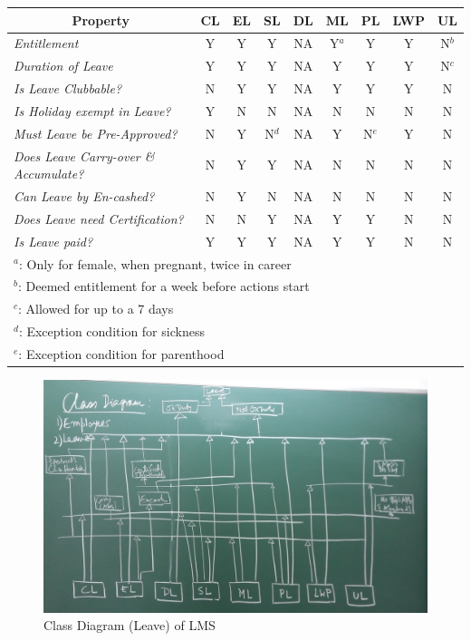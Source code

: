 \documentclass{article}
\begin{document}
\begin{center}

\begin{tabular}{|l|c|c|c|c|c|c|c|c|}\hline
\multicolumn{1}{|c|}{\bf Property} & 
\multicolumn{1}{c|}{\bf CL} &
\multicolumn{1}{c|}{\bf EL} &
\multicolumn{1}{c|}{\bf SL} &
\multicolumn{1}{c|}{\bf DL} &
\multicolumn{1}{c|}{\bf ML} &
\multicolumn{1}{c|}{\bf PL} &
\multicolumn{1}{c|}{\bf LWP} &
\multicolumn{1}{c|}{\bf UL} \\ \hline
{\em Entitlement} & Y & Y & Y & NA & Y$^a$ & Y & Y & N$^b$ \\ \hline
{\em Duration of Leave} & Y & Y & Y & NA & Y & Y & Y & N$^c$ \\ \hline
{\em Is Leave Clubbable?} & N & Y & Y & NA & Y & Y & Y & N \\ \hline
{\em Is Holiday exempt in Leave?} & Y & N & N & NA & N & N & N & N \\ \hline
{\em Must Leave be Pre-Approved?} & N & Y & N$^d$ & NA & Y & N$^e$ & Y & N \\ \hline
{\em Does Leave Carry-over \& Accumulate?} & N & Y & Y & NA & N & N & N & N \\ \hline
{\em Can Leave by En-cashed?} & N & Y & N & NA & N & N & N & N \\ \hline
{\em Does Leave need Certification?} & N & N & Y & NA & Y & Y & N & N \\ \hline
{\em Is Leave paid?} & Y & Y & Y & NA & Y & Y & N & N \\ \hline \hline
\multicolumn{9}{l}{$^a$: Only for female, when pregnant, twice in career} \\ 
\multicolumn{9}{l}{$^b$: Deemed entitlement for a week before actions start} \\ 
\multicolumn{9}{l}{$^c$: Allowed for up to a 7 days} \\ 
\multicolumn{9}{l}{$^d$: Exception condition for sickness} \\ 
\multicolumn{9}{l}{$^e$: Exception condition for parenthood} \\ 
\end{tabular}

\end{center}

\newpage
\begin{figure}[ht]
\centering
\includegraphics[width=12cm]{Images/Class_1.jpg}
\caption{Class Diagram (Leave) of LMS
\label{fig:use-case}
}
\end{figure}
\end{document}

